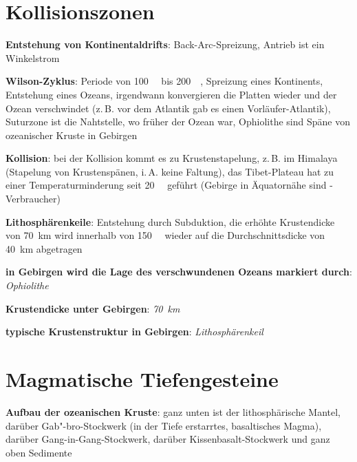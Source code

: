 \pagebreak

\section{%
    Kollisionszonen%
}

\textbf{Entstehung von Kontinentaldrifts}:
Back-Arc-Spreizung,
Antrieb ist ein Winkelstrom

\textbf{Wilson-Zyklus}:
Periode von \SI{100}{\mega\year} bis \SI{200}{\mega\year},
Spreizung eines Kontinents,
Entstehung eines Ozeans,
irgendwann konvergieren die Platten wieder und der Ozean verschwindet
(z.\,B. vor dem Atlantik gab es einen Vorläufer-Atlantik),
Suturzone ist die Nahtstelle, wo früher der Ozean war,
Ophiolithe sind Späne von ozeanischer Kruste in Gebirgen

\textbf{Kollision}:
bei der Kollision kommt es zu Krustenstapelung, z.\,B. im Himalaya
(Stapelung von Krustenspänen, i.\,A. keine Faltung),
das Tibet-Plateau hat zu einer Temperaturminderung seit \SI{20}{\mega\year} geführt
(Gebirge in Äquatornähe sind -Verbraucher)

\textbf{Lithosphärenkeile}:
Entstehung durch Subduktion,
die erhöhte Krustendicke von \SI{70}{\kilo\meter} wird innerhalb von
\SI{150}{\mega\year} wieder auf die Durchschnittsdicke von \SI{40}{\kilo\meter} abgetragen

\begin{wichtig}
    \item
    \textbf{in Gebirgen wird die Lage des verschwundenen Ozeans markiert durch}:\\
    \emph{Ophiolithe}

    \item
    \textbf{Krustendicke unter Gebirgen}:
    \emph{\SI[math-rm=\mathit,text-rm=\itshape]{70}{\kilo\meter}}

    \item
    \textbf{typische Krustenstruktur in Gebirgen}:
    \emph{Lithosphärenkeil}
\end{wichtig}

\section{%
    Magmatische Tiefengesteine%
}

\textbf{Aufbau der ozeanischen Kruste}:
ganz unten ist der lithosphärische Mantel,
darüber Gab"-bro-Stockwerk (in der Tiefe erstarrtes, basaltisches Magma),
darüber Gang-in-Gang-Stockwerk,
darüber Kissenbasalt-Stockwerk und
ganz oben Sedimente

